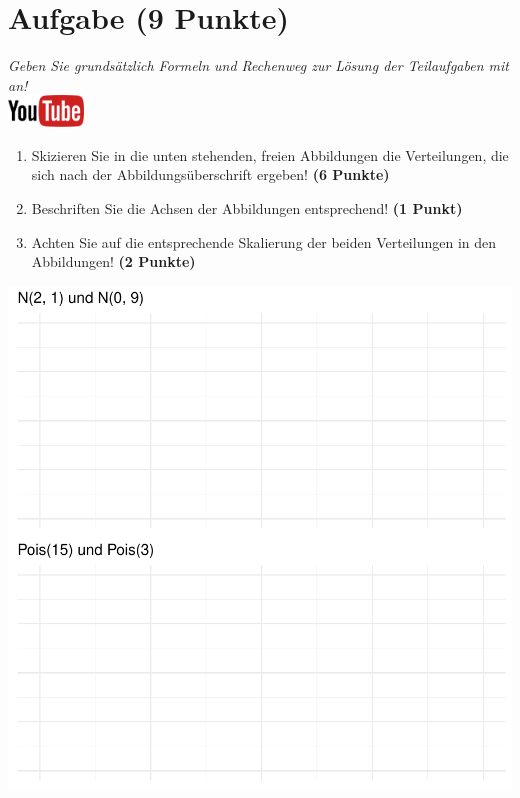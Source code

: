 \documentclass[a4paper, 10pt]{scrartcl}\usepackage[]{graphicx}\usepackage[]{xcolor}
\makeatletter
\def\maxwidth{ %
  \ifdim\Gin@nat@width>\linewidth
    \linewidth
  \else
    \Gin@nat@width
  \fi
}
\makeatother
\begin{document}
\section{Aufgabe \hfill (9 Punkte)}

\textit{Geben Sie grunds{\"a}tzlich Formeln und Rechenweg zur L{\"o}sung der
  Teilaufgaben mit an!} \\[1Ex]

\hfill\href{https://youtu.be/MiD42k4l5Ag}{\includegraphics[width =
  2cm]{img/youtube}}\\[1Ex]



\begin{enumerate}
\item Skizieren Sie in die unten stehenden, freien Abbildungen die
  Verteilungen, die sich nach der Abbildungs{\"u}berschrift ergeben! \textbf{(6
    Punkte)}
\item Beschriften Sie die Achsen der Abbildungen entsprechend! \textbf{(1
    Punkt)}
\item Achten Sie auf die entsprechende Skalierung der beiden Verteilungen
  in den Abbildungen! \textbf{(2 Punkte)}
\end{enumerate}



{\centering \includegraphics[width=\maxwidth]{img/histogram-01-1} 

}
\end{document}
